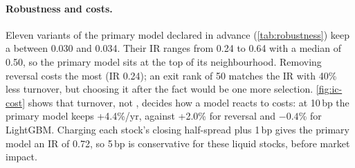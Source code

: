 \paragraph{Robustness and costs.}
Eleven variants of the primary model declared in advance (\cref{tab:robustness}) keep a \ric{} between 0.030 and 0.034.
Their IR ranges from 0.24 to 0.64 with a median of 0.50, so the primary model sits at the top of its neighbourhood.
Removing reversal costs the most (IR 0.24); an exit rank of 50 matches the IR with 40\% less turnover, but choosing it after the fact would be one more selection.
\cref{fig:ic-cost} shows that turnover, not \ric{}, decides how a model reacts to costs: at 10\,bp the primary model keeps +4.4\%/yr, against +2.0\% for reversal and $-0.4$\% for LightGBM.
Charging each stock's closing half-spread plus 1\,bp gives the primary model an IR of 0.72, so 5\,bp is conservative for these liquid stocks, before market impact.

